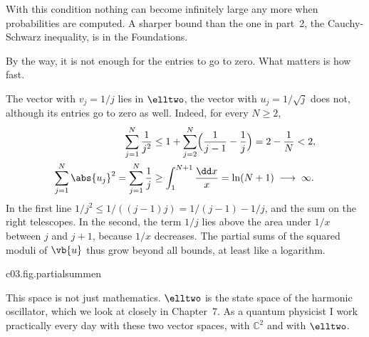 \begin{vertiefung}
  With this condition nothing can become infinitely large any more when probabilities are
  computed. A sharper bound than the one in part~2, the Cauchy-Schwarz inequality, is in the
  Foundations.

  By the way, it is not enough for the entries to go to zero. What matters is how fast.

  \begin{example}\label{c03.ex.rate}
    The vector with $v_j = 1/j$ lies in $\elltwo$, the vector with $u_j = 1/\sqrt{j}$ does
    not, although its entries go to zero as well. Indeed, for every $N \geq 2$,
    \begin{equation}\label{c03.eq.rate}
      \begin{aligned}
        \sum_{j=1}^{N} \frac{1}{j^2}
          &\leq 1 + \sum_{j=2}^{N} \Bigl( \frac{1}{j-1} - \frac{1}{j} \Bigr)
           = 2 - \frac{1}{N} < 2, \\
        \sum_{j=1}^{N} \abs{u_j}^2 = \sum_{j=1}^{N} \frac{1}{j}
          &\geq \int_{1}^{N+1} \frac{\dd x}{x} = \ln(N+1) \;\longrightarrow\; \infty .
      \end{aligned}
    \end{equation}
    In the first line $1/j^2 \leq 1/((j-1)j) = 1/(j-1) - 1/j$, and the sum on the right
    telescopes. In the second, the term $1/j$ lies above the area under $1/x$ between $j$ and
    $j+1$, because $1/x$ decreases. The partial sums of the squared moduli of $\vb{u}$ thus
    grow beyond all bounds, at least like a logarithm.
  \end{example}

  \begin{tpcfigure}{c03.fig.partialsummen}
    \caption{The admission test for $\elltwo$: the partial sums
      $\sum_{j=1}^{N} \abs{v_j}^2$ for $N = 1, \dots, 25$, rounded to four places; the curve
      for the vector of all ones is drawn only up to $N = 5$. For $v_j = 1/j$
      (dots, solid) they stay below the bound $2$ of Equation~\eqref{c03.eq.rate} (thin
      line): the vector is admitted. For $v_j = 1/\sqrt{j}$ (dots, dashed) they grow beyond
      all bounds, at least like $\ln(N+1)$, for the vector made up entirely of ones (dots, dash-dotted) like $N$: neither
      is admitted, although in the middle case the entries go to zero. In $\mathbb{C}^n$ the
      sum has only $n$ terms, and there is nothing to test.}
  \end{tpcfigure}

  This space is not just mathematics. $\elltwo$ is the state space of the harmonic
  oscillator, which we look at closely in Chapter~7. As a quantum physicist I work
  practically every day with these two vector spaces, with $\mathbb{C}^2$ and with
  $\elltwo$.
\end{vertiefung}

